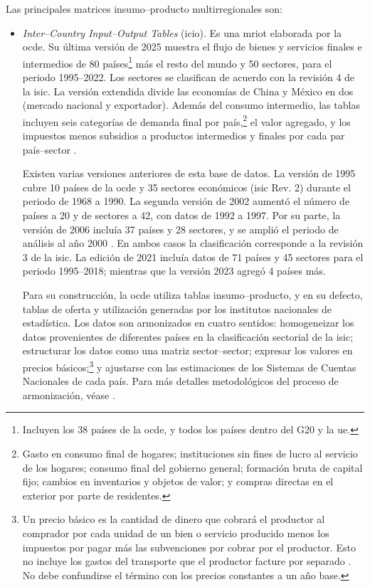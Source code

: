 Las principales matrices insumo--producto multirregionales son:
\begin{itemize}
 \item \textit{Inter--Country Input--Output Tables} (\acrshort{icio}). Es una \gls{mriot} elaborada por la \gls{ocde}. Su última versión de 2025 muestra el flujo de bienes y servicios finales e intermedios de 80 países\footnote{Incluyen los 38 países de la  \gls{ocde}, y todos los países dentro del G20 y la \gls{ue}.} más el resto del mundo y 50 sectores, para el periodo 1995--2022. Los sectores se clasifican de acuerdo con la revisión 4 de la \gls{isic}. La versión extendida divide las economías de China y México en dos (mercado nacional y exportador).  Además del consumo intermedio, las tablas incluyen seis categorías de demanda final por país,\footnote{Gasto en consumo final de hogares; instituciones sin fines de lucro al servicio de los hogares; consumo final del gobierno general; formación bruta de capital fijo; cambios en inventarios y objetos de valor; y compras directas en el exterior por parte de residentes.} el valor agregado, y los impuestos menos subsidios a productos intermedios y finales por cada par país--sector \parencite{OECD-ICIO}.
 
 Existen varias versiones anteriores de esta base de datos. La versión de 1995 cubre 10 países de la \gls{ocde} y 35 sectores económicos (\gls{isic} Rev. 2) durante el periodo de 1968 a 1990. La segunda versión de 2002 aumentó el número de países a 20 y de sectores a 42, con datos de 1992 a 1997. Por su parte, la versión de 2006 incluía 37 países y 28 sectores, y se amplió el periodo de análisis al año 2000 \parencite{Yamano2006}. En ambos casos la clasificación corresponde a la revisión 3 de la \gls{isic}. La edición de 2021 incluía datos de 71 países y 45 sectores para el periodo 1995--2018; mientras que la versión 2023 agregó 4 países más.
 
 Para su construcción, la \gls{ocde} utiliza tablas insumo--producto, y en su defecto, tablas de oferta y utilización generadas por los institutos nacionales de estadística. Los datos son armonizados en cuatro sentidos: homogeneizar los datos provenientes de diferentes países en la clasificación sectorial de la \gls{isic}; estructurar los datos como una matriz sector--sector; expresar los valores en precios básicos;\footnote{Un precio básico es la cantidad de dinero que cobrará el productor al comprador por cada unidad de un bien o servicio producido menos los impuestos por pagar más las subvenciones por cobrar por el productor. Esto no incluye los gastos del transporte que el productor facture por separado \parencite[p.~8]{CEPAL2013}. No debe confundirse el término con los precios constantes a un año base.} y ajustarse con las estimaciones de los Sistemas de Cuentas Nacionales de cada país. Para más detalles metodológicos del proceso de armonización, véase \textcite{Yamano2006}.
 

\end{itemize}
